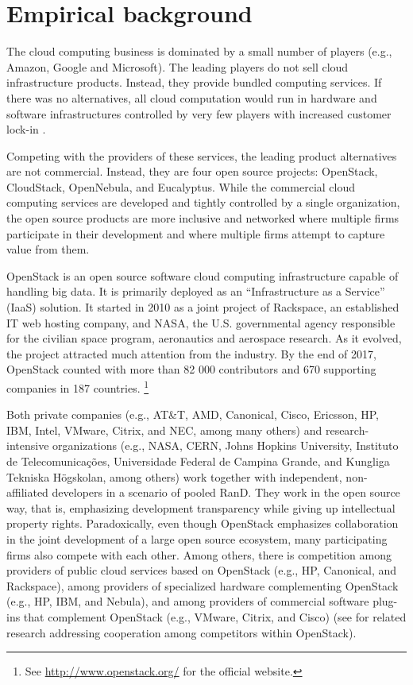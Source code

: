 \documentclass[dvipsnames]{interact}
\theoremstyle{plain}\newtheorem{theorem}{Theorem}[section]
\theoremstyle{definition}
\theoremstyle{remark}
\begin{document}
 





\section{Empirical background}


The cloud computing business is dominated by a small number of players (e.g., Amazon, Google and Microsoft). The leading players do not sell cloud infrastructure products. Instead, they provide bundled computing services. If there was no alternatives, all cloud computation would run in hardware and software infrastructures controlled by very few players with increased customer lock-in \citep{Teixeira_et_al2015}. 

Competing with the providers of these services, the leading product alternatives are not commercial. Instead, they are four open source projects: OpenStack, CloudStack, OpenNebula, and Eucalyptus. While the commercial cloud computing services are developed and tightly controlled by a single organization, the open source products are more inclusive and networked where multiple firms participate in their development and where multiple firms attempt to capture value from them.

OpenStack is an open source software cloud computing infrastructure capable of handling big data. It is primarily deployed as an ``Infrastructure as a Service'' (IaaS) solution.  It started in 2010 
as a joint project of Rackspace, an established IT web hosting company, and NASA, the U.S. governmental agency responsible for the civilian space program, aeronautics and aerospace research.  As it evolved,  the project attracted much attention from the industry. 
By the end of 2017, OpenStack counted with more than 82 000 contributors and 670 supporting companies in 187 countries. \footnote{See \url{http://www.openstack.org/} for the official website.}

Both private companies (e.g.,  AT\&T, AMD, Canonical, Cisco, Ericsson, HP, IBM, Intel, VMware, Citrix, and NEC,  among many others) and research-intensive organizations (e.g., NASA, CERN, Johns Hopkins University, Instituto de Telecomunicações, Universidade Federal de Campina Grande, and Kungliga Tekniska Högskolan, among  others)  work  together with independent, non-affiliated developers in a scenario of pooled  \ac{RanD}. 
They work in the open source way, that is, emphasizing development transparency while giving up intellectual property rights. Paradoxically, even though OpenStack emphasizes collaboration in the joint development of a large open source ecosystem, many participating firms also compete  with each other. Among others, there is competition among providers of public cloud services based on OpenStack (e.g., HP, Canonical, and Rackspace), among providers of specialized hardware complementing OpenStack (e.g., HP, IBM, and Nebula), and among providers of commercial software plug-ins that complement OpenStack (e.g., VMware, Citrix, and Cisco) (see \citep{teixeira_et_al_icis2016,Teixeira_et_al2015} for related research addressing cooperation among competitors within OpenStack). 
\end{document}
